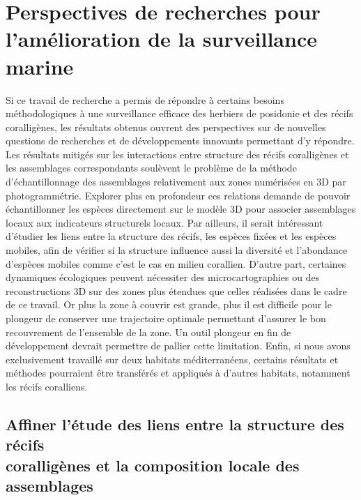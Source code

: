 \section{Perspectives de recherches pour l’amélioration de la surveillance marine}\label{discussion.3}

Si ce travail de recherche a permis de répondre à certains besoins méthodologiques à une surveillance efficace des herbiers de posidonie et des récifs coralligènes, les résultats obtenus ouvrent des perspectives sur de nouvelles questions de recherches et de développements innovants permettant d’y répondre. Les résultats mitigés sur les interactions entre structure des récifs coralligènes et les assemblages correspondants soulèvent le problème de la méthode d’échantillonnage des assemblages relativement aux zones numérisées en 3D par photogrammétrie. Explorer plus en profondeur ces relations demande de pouvoir échantillonner les espèces directement sur le modèle 3D pour associer assemblages locaux aux indicateurs structurels locaux. Par ailleurs, il serait intéressant d’étudier les liens entre la structure des récifs, les espèces fixées et les espèces mobiles, afin de vérifier si la structure influence aussi la diversité et l’abondance d’espèces mobiles comme c’est le cas en milieu corallien. D’autre part, certaines dynamiques écologiques peuvent nécessiter des microcartographies ou des reconstructions 3D sur des zones plus étendues que celles réalisées dans le cadre de ce travail. Or plus la zone à couvrir est grande, plus il est difficile pour le plongeur de conserver une trajectoire optimale permettant d’assurer le bon recouvrement de l’ensemble de la zone. Un outil plongeur en fin de développement devrait permettre de pallier cette limitation. Enfin, si nous avons exclusivement travaillé sur deux habitats méditerranéens, certains résultats et méthodes pourraient être transférés et appliqués à d’autres habitats, notamment les récifs coralliens.

\subsection{Affiner l’étude des liens entre la structure des récifs\\ coralligènes et la composition locale des assemblages}


